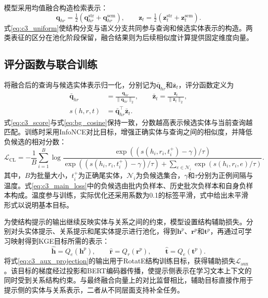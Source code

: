 模型采用均值融合构造检索表示：
\begin{equation}
    \mathbf{q}_{hr}=\tfrac12(\mathbf{q}_{hr}^{\mathrm{str}}+\mathbf{q}_{hr}^{\mathrm{sem}}),\qquad
    \mathbf{z}_{t}=\tfrac12(\mathbf{z}_{t}^{\mathrm{str}}+\mathbf{z}_{t}^{\mathrm{sem}}).
    \label{eq:c3_uniform}
\end{equation}
式\eqref{eq:c3_uniform}使结构分支与语义分支共同参与查询和候选实体表示的构造。两类表征的区分在池化阶段保留，融合结果则为后续相似度计算提供固定维度向量。

\subsection{评分函数与联合训练}

将融合后的查询与候选实体表示归一化，分别记为$\bar{\mathbf{q}}_{hr}$和$\bar{\mathbf{z}}_t$，评分函数定义为
\begin{equation}
\begin{aligned}
    \bar{\mathbf{q}}_{hr}&=\frac{\mathbf{q}_{hr}}{\|\mathbf{q}_{hr}\|_2},\qquad
    \bar{\mathbf{z}}_t=\frac{\mathbf{z}_t}{\|\mathbf{z}_t\|_2},\\
    s(h,r,t)&=\bar{\mathbf{q}}_{hr}^{\top}\bar{\mathbf{z}}_t.
\end{aligned}
    \label{eq:c3_score}
\end{equation}
式\eqref{eq:c3_score}与式\eqref{eq:bg_cosine}保持一致，分数越高表示候选实体与当前查询越匹配。训练时采用InfoNCE对比目标\cite{oord2018cpc,wang2022simkgc}，增强正确实体与查询之间的相似度，并降低负候选的相对分数：
\begin{equation}
    \mathcal{L}_{\mathrm{CL}}=-\frac1B\sum_{i=1}^{B}
    \log\frac{\exp((s(h_i,r_i,t_i^+)-\gamma)/\tau)}
    {\exp((s(h_i,r_i,t_i^+)-\gamma)/\tau)
       +\sum_{e\in\mathcal{N}_i}\exp(s(h_i,r_i,e)/\tau)}.
    \label{eq:c3_main_loss}
\end{equation}
其中，$B$为批量大小，$t_i^+$为正确尾实体，$\mathcal{N}_i$为负候选集合，$\gamma$和$\tau$分别为正例间隔与温度。式\eqref{eq:c3_main_loss}中的负候选由批内负样本、历史批次负样本和自身负样本构成。温度参与训练，实际优化还采用系数为0.1的标签平滑\cite{szegedy2016rethinking}，式中给出未平滑形式以说明基本目标。

为使结构提示的输出继续反映实体与关系之间的约束，模型设置结构辅助损失。分别对头实体提示、关系提示和尾实体提示进行池化，得到$\mathbf{h}^{p}$、$\mathbf{r}^{p}$和$\mathbf{t}^{p}$，再通过可学习映射得到KGE目标所需的表示：
\begin{equation}
    \widehat{\mathbf{h}}=Q_e(\mathbf{h}^{p}),\qquad
    \widehat{\mathbf{r}}=Q_r(\mathbf{r}^{p}),\qquad
    \widehat{\mathbf{t}}=Q_e(\mathbf{t}^{p}).
    \label{eq:c3_aux_projection}
\end{equation}
将式\eqref{eq:c3_aux_projection}的输出用于RotatE结构训练目标，获得辅助损失$\mathcal{L}_{\mathrm{aux}}$。该目标的梯度经过投影和BERT编码器传播，使提示侧表示在学习文本上下文的同时受到关系结构约束。与最终融合向量上的对比监督相比，辅助目标直接作用于提示侧的实体与关系表示，二者从不同层面支持补全任务。

